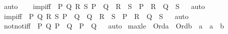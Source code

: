 \begin{isabellebody}
%
\isatagproof
{}\isamarkupfalse%
\ auto%
\endisatagproof
{\isafoldproof}%
%
\isadelimproof
%
\endisadelimproof
\ \ \isanewline
{}\isamarkupfalse%
\ imp{\isacharunderscore}{\kern0pt}iff\ {\isacharcolon}{\kern0pt}\ {\isachardoublequoteopen}{\isasymAnd}P\ Q\ R\ S{\isachardot}{\kern0pt}\ P\ {\isasymlongleftrightarrow}\ Q\ {\isasymLongrightarrow}\ {\isacharparenleft}{\kern0pt}R\ {\isasymlongleftrightarrow}\ S{\isacharparenright}{\kern0pt}\ {\isasymLongrightarrow}\ {\isacharparenleft}{\kern0pt}P\ {\isasymlongrightarrow}\ R{\isacharparenright}{\kern0pt}\ {\isasymlongleftrightarrow}\ {\isacharparenleft}{\kern0pt}Q\ {\isasymlongrightarrow}\ S{\isacharparenright}{\kern0pt}{\isachardoublequoteclose}%
\isadelimproof
\ %
\endisadelimproof
%
\isatagproof
{}\isamarkupfalse%
\ auto%
\endisatagproof
{\isafoldproof}%
%
\isadelimproof
%
\endisadelimproof
\isanewline
{}\isamarkupfalse%
\ imp{\isacharunderscore}{\kern0pt}iff{}\ {\isacharcolon}{\kern0pt}\ {\isachardoublequoteopen}{\isasymAnd}P\ Q\ R\ S{\isachardot}{\kern0pt}\ P\ {\isasymlongleftrightarrow}\ Q\ {\isasymLongrightarrow}\ {\isacharparenleft}{\kern0pt}Q\ {\isasymLongrightarrow}\ R\ {\isasymlongleftrightarrow}\ S{\isacharparenright}{\kern0pt}\ {\isasymLongrightarrow}\ {\isacharparenleft}{\kern0pt}P\ {\isasymlongrightarrow}\ R{\isacharparenright}{\kern0pt}\ {\isasymlongleftrightarrow}\ {\isacharparenleft}{\kern0pt}Q\ {\isasymlongrightarrow}\ S{\isacharparenright}{\kern0pt}{\isachardoublequoteclose}%
\isadelimproof
\ %
\endisadelimproof
%
\isatagproof
{}\isamarkupfalse%
\ auto%
\endisatagproof
{\isafoldproof}%
%
\isadelimproof
%
\endisadelimproof
\ \ \isanewline
{}\isamarkupfalse%
\ notnot{\isacharunderscore}{\kern0pt}iff\ {\isacharcolon}{\kern0pt}\ {\isachardoublequoteopen}{\isasymAnd}P\ Q{\isachardot}{\kern0pt}\ P\ {\isasymlongleftrightarrow}\ Q\ {\isasymLongrightarrow}\ {\isasymnot}P\ {\isasymlongleftrightarrow}\ {\isasymnot}Q{\isachardoublequoteclose}%
\isadelimproof
\ %
\endisadelimproof
%
\isatagproof
{}\isamarkupfalse%
\ auto%
\endisatagproof
{\isafoldproof}%
%
\isadelimproof
%
\endisadelimproof
\isanewline
\isanewline
{}\isamarkupfalse%
\ max{\isacharunderscore}{\kern0pt}le{}\ {\isacharcolon}{\kern0pt}\ {\isachardoublequoteopen}Ord{\isacharparenleft}{\kern0pt}a{\isacharparenright}{\kern0pt}\ {\isasymLongrightarrow}\ Ord{\isacharparenleft}{\kern0pt}b{\isacharparenright}{\kern0pt}\ {\isasymLongrightarrow}\ a\ {\isasymle}\ a\ {\isasymunion}\ b{\isachardoublequoteclose}\ \isanewline

\end{isabellebody}

